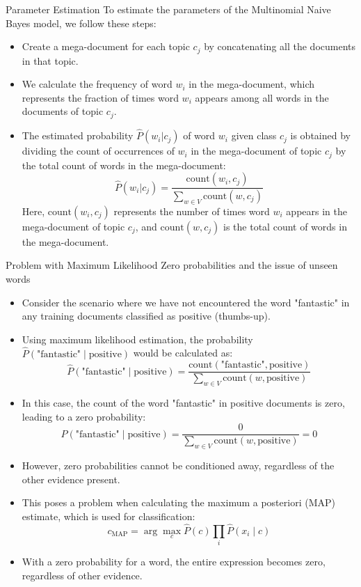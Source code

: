 \documentclass[handout]{beamer}
\begin{document}
\begin{frame}{Parameter Estimation}
\scriptsize
To estimate the parameters of the Multinomial Naive Bayes model, we follow these steps:

\begin{itemize}
  \item Create a mega-document for each topic $c_j$ by concatenating all the documents in that topic.
  \item We calculate the frequency of word $w_i$ in the mega-document, which represents the fraction of times word $w_i$ appears among all words in the documents of topic $c_j$.
  \item The estimated probability $\hat{P}(w_i | c_j)$ of word $w_i$ given class $c_j$ is obtained by dividing the count of occurrences of $w_i$ in the mega-document of topic $c_j$ by the total count of words in the mega-document:
  \[
  \hat{P}(w_i | c_j) = \frac{{\text{{count}}(w_i, c_j)}}{\sum_{w\in V}{\text{{count}}(w, c_j)}}
  \]
  Here, $\text{{count}}(w_i, c_j)$ represents the number of times word $w_i$ appears in the mega-document of topic $c_j$, and $\text{{count}}(w, c_j)$ is the total count of words in the mega-document.
\end{itemize}
\end{frame}

\begin{frame}{Problem with Maximum Likelihood}
\scriptsize
Zero probabilities and the issue of unseen words
\begin{itemize}
    \item Consider the scenario where we have not encountered the word "fantastic" in any training documents classified as positive (thumbs-up).
    \item Using maximum likelihood estimation, the probability $\hat{P}(\text{"fantastic"} \mid \text{positive})$ would be calculated as:
    \[
    \hat{P}(\text{"fantastic"} \mid \text{positive}) = \frac{\text{count}(\text{"fantastic"}, \text{positive})}{\sum_{w \in V} \text{count}(w, \text{positive})}
    \]
    \item In this case, the count of the word "fantastic" in positive documents is zero, leading to a zero probability:
    \[
    \hat{P}(\text{"fantastic"} \mid \text{positive}) = \frac{0}{\sum_{w \in V} \text{count}(w, \text{positive})} = 0
    \]
    \item However, zero probabilities cannot be conditioned away, regardless of the other evidence present.
    \item This poses a problem when calculating the maximum a posteriori (MAP) estimate, which is used for classification:
    \[
    c_{\text{MAP}} = \arg\max_c \hat{P}(c) \prod_{i} \hat{P}(x_i \mid c)
    \]
    \item With a zero probability for a word, the entire expression becomes zero, regardless of other evidence.
\end{itemize}
\end{frame}
\end{document}
